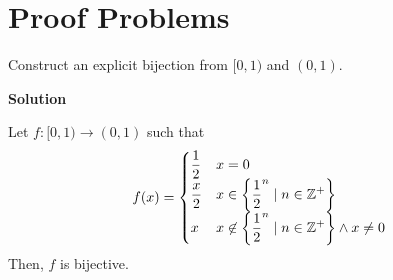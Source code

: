 \documentclass[11pt]{scrartcl}
\theoremstyle{dotlessP}
\theoremstyle{dotlessN}
\DeclarePairedDelimiter\set{\{}{\}}
\newcommand{\ints}{\mathbb{Z}}
\begin{document}
\section{Proof Problems}
\begin{ques}
	 Construct an explicit bijection from $[0,1)$ and  $(0,1)$.
\end{ques}
\textbf{Solution}
\begin{claim*}
	Let $f: [0,1) \to (0,1)$ such that
	\[
	f(x) =
	\begin{cases}
		\displaystyle \frac{1}{2} & x = 0 \\
		\displaystyle\frac{x}{2} & x \in \set*{\displaystyle\frac{1}{2}^n \mid n \in \ints^+} \\
		x & x \not\in \set*{\displaystyle\frac{1}{2}^n \mid n \in \ints^+} \land x \neq 0
	\end{cases}
	\] 
	Then, $f$ is bijective.
\end{claim*}
\end{document}
